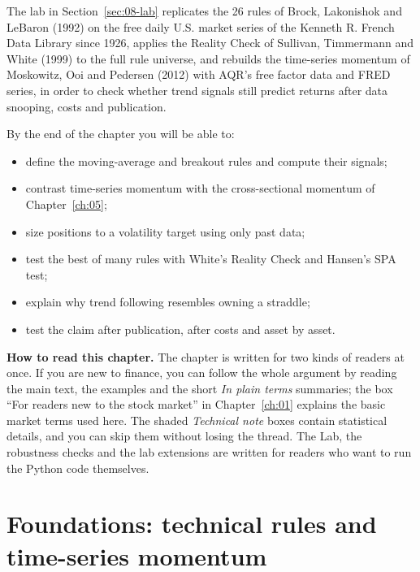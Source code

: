 The lab in Section~\ref{sec:08-lab} replicates the 26 rules of Brock, Lakonishok and LeBaron (1992) on the free daily U.S. market series of the Kenneth R. French Data Library since 1926, applies the Reality Check of Sullivan, Timmermann and White (1999) to the full rule universe, and rebuilds the time-series momentum of Moskowitz, Ooi and Pedersen (2012) with AQR's free factor data and FRED series, in order to check whether trend signals still predict returns after data snooping, costs and publication.

By the end of the chapter you will be able to:

\begin{itemize}
  \item define the moving-average and breakout rules and compute their signals;
  \item contrast time-series momentum with the cross-sectional momentum of Chapter~\ref{ch:05};
  \item size positions to a volatility target using only past data;
  \item test the best of many rules with White's Reality Check and Hansen's SPA test;
  \item explain why trend following resembles owning a straddle;
  \item test the claim after publication, after costs and asset by asset.
\end{itemize}

\begin{callout}
\textbf{How to read this chapter.} The chapter is written for two kinds of readers at once. If you are new to finance, you can follow the whole argument by reading the main text, the examples and the short \emph{In plain terms} summaries; the box ``For readers new to the stock market'' in Chapter~\ref{ch:01} explains the basic market terms used here. The shaded \emph{Technical note} boxes contain statistical details, and you can skip them without losing the thread. The Lab, the robustness checks and the lab extensions are written for readers who want to run the Python code themselves.
\end{callout}

\section{Foundations: technical rules and time-series momentum}
\label{sec:08-foundations}

